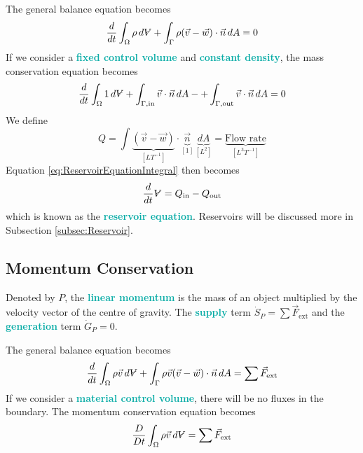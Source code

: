 \documentclass[twoside]{article}
\makeatletter
\DeclareRobustCommand{\vol}{\text{\volumedash}V}
\newcommand{\volumedash}{%
	\makebox[0pt][l]{%
		\ooalign{\hfil\hphantom{$\m@th V$}\hfil\cr\kern0.16em\rotatebox{27.5}{\textbf{--}}\hfil\cr}%
	}%
}
\newcommand{\highlightbluetext}[1]{\textcolor[HTML]{09ACA6}{\textbf{#1}}}
\numberwithin{equation}{section}
\makeatother
\begin{document}
	The general balance equation becomes
	\begin{equation}
		\frac{d}{dt} \int_\Omega \rho \, d\vol+\int_\Gamma \rho (\vec{v}-\vec{w}) \cdot \vec{n} \, dA = 0
		\label{eq:MassConservationIntegral}
	\end{equation}
	If we consider a \highlightbluetext{fixed control volume} and \highlightbluetext{constant density}, the mass conservation equation becomes
	\begin{equation}
		\frac{d}{dt} \int_\Omega 1 \, d\vol+\int_{\Gamma, \text{in}} \vec{v} \cdot \vec{n} \, dA-+\int_{\Gamma, \text{out}} \vec{v} \cdot \vec{n} \, dA = 0
		\label{eq:ReservoirEquationIntegral}
	\end{equation}
	We define
	\begin{equation}
		Q = \int \underbrace{(\vec{v}-\vec{w})}_{[LT^{-1}]} \cdot \underbrace{\vec{n}}_{[1]} \, \underbrace{dA}_{[L^2]} = \underbrace{\text{Flow rate}}_{[L^3T^{-1}]}
	\end{equation}
	Equation \ref{eq:ReservoirEquationIntegral} then becomes
	\begin{equation}
		\frac{d}{dt} \vol = Q_{\text{in}}-Q_{\text{out}}
	\end{equation}
	which is known as the \highlightbluetext{reservoir equation}. Reservoirs will be discussed more in Subsection \ref{subsec:Reservoir}.
	
	\subsection{Momentum Conservation}
	\label{subsec:MomentumConservation}
	
	Denoted by $P$, the \highlightbluetext{linear momentum} is the mass of an object multiplied by the velocity vector of the centre of gravity. The \highlightbluetext{supply} term $\dot{S}_P = \sum \vec{F}_{\text{ext}}$ and the \highlightbluetext{generation} term $\dot{G}_P = 0$.
	
	The general balance equation becomes
	\begin{equation}
		\frac{d}{dt} \int_\Omega \rho \vec{v} \, d\vol+\int_\Gamma \rho \vec{v} (\vec{v}-\vec{w}) \cdot \vec{n} \, dA = \sum \vec{F}_{\text{ext}}
		\label{eq:MomentumConservationIntegral}
	\end{equation}
	If we consider a \highlightbluetext{material control volume}, there will be no fluxes in the boundary. The momentum conservation equation becomes
	\begin{equation}
		\frac{D}{Dt} \int_\Omega \rho \vec{v} \, d\vol = \sum \vec{F}_{\text{ext}}
		\label{eq:MCVMomentumConservationIntegral}
	\end{equation}
	
\end{document}
